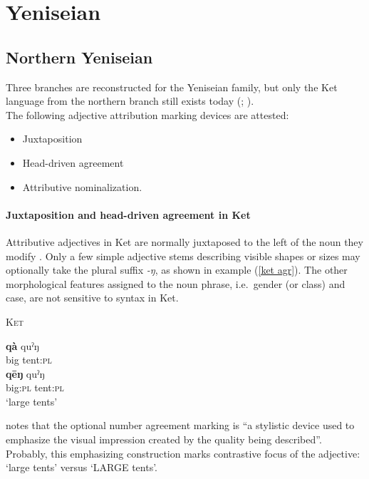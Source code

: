 \section{Yeniseian}\label{yeniseian synchr}
\subsection{Northern Yeniseian}
Three branches are reconstructed for the Yeniseian family, but only the Ket language from the northern branch still exists today (\citealt{werner1997a}; \citealt[223]{salminen2007}).\\

\noindent The following adjective attribution marking devices are attested:
\begin{itemize}
\item Juxtaposition
\item Head-driven agreement
\item Attributive nominalization.
\end{itemize}

\paragraph{Juxtaposition and head-driven agreement in Ket}
Attributive adjectives in Ket are normally juxtaposed to the left of the noun they modify \cite[38]{vajda2004}. Only a few simple adjective stems describing visible shapes or sizes may optionally take the plural suffix \textit{-ŋ}, as shown in example (\ref{ket agr}). The other morphological features assigned to the noun phrase, i.e.~gender (or class) and case, are not sensitive to syntax in Ket.

\begin{exe}
\ex \textsc{Ket} \cite[38]{vajda2004} \label{ket agr}
\begin{xlist}
\ex	
\gll	\textbf{qà} quˀŋ\\
	big tent:\textsc{pl}\\
\ex	
\gll	\textbf{qēŋ} quˀŋ\\
	big:\textsc{pl} tent:\textsc{pl}\\
\glt	‘large tents’
\end{xlist}
\end{exe}
\citet[38]{vajda2004} notes that the optional number agreement marking is “a stylistic device used to emphasize the visual impression created by the quality being described”. Probably, this emphasizing construction marks contrastive focus of the adjective: ‘large tents’ versus ‘LARGE tents’. 

